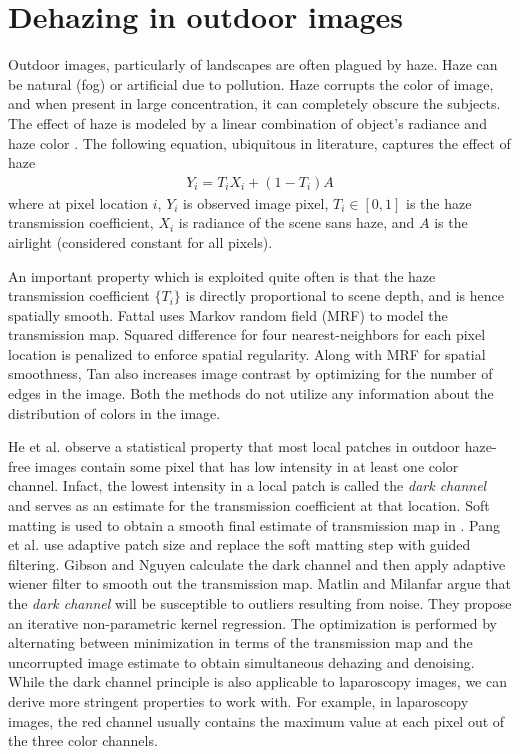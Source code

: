 \section{Dehazing in outdoor images}
Outdoor images, particularly of landscapes are often plagued by haze. Haze can be natural (fog) or artificial due to pollution. Haze corrupts the color of image, and when present in large concentration, it can completely obscure the subjects. The effect of haze is modeled by a linear combination of object's radiance and haze color \cite{koschmieder1925smokemodel}. The following equation, ubiquitous in literature, captures the effect of haze
\begin{align}
    Y_i = T_i X_i + \left( 1 - T_i \right) A \label{eqn:hazemodel}
\end{align}
where at pixel location $i$, $Y_i$ is observed image pixel, $T_i \in [0, 1]$ is the haze transmission coefficient, $X_i$ is radiance of the scene sans haze, and $A$ is the airlight (considered constant for all pixels). 

An important property which is exploited quite often is that the haze transmission coefficient $\lbrace T_i \rbrace$ is directly proportional to scene depth, and is hence spatially smooth. Fattal \cite{fattal2008single} uses Markov random field (MRF) to model the transmission map. Squared difference for four nearest-neighbors for each pixel location is penalized to enforce spatial regularity. Along with MRF for spatial smoothness, Tan \cite{tan2008visibility} also increases image contrast by optimizing for the number of edges in the image. Both the methods do not utilize any information about the distribution of colors in the image.

He et al. \cite{he2011dark} observe a statistical property that most local patches in outdoor haze-free images contain some pixel that has low intensity in at least one color channel. Infact, the lowest intensity in a local patch is called the \emph{dark channel} and serves as an estimate for the transmission coefficient at that location. Soft matting is used to obtain a smooth final estimate of transmission map in \cite{he2011dark}. Pang et al. \cite{pang2011improved} use adaptive patch size and replace the soft matting step with guided filtering. Gibson and Nguyen \cite{gibson2013wiener} calculate the dark channel and then apply adaptive wiener filter to smooth out the transmission map. Matlin and Milanfar \cite{matlin2012removal} argue that the \emph{dark channel} will be susceptible to outliers resulting from noise. They propose an iterative non-parametric kernel regression. The optimization is performed by alternating between minimization in terms of the transmission map and the uncorrupted image estimate to obtain simultaneous dehazing and denoising. While the dark channel principle is also applicable to laparoscopy images, we can derive more stringent properties to work with. For example, in laparoscopy images, the red channel usually contains the maximum value at each pixel out of the three color channels. 

